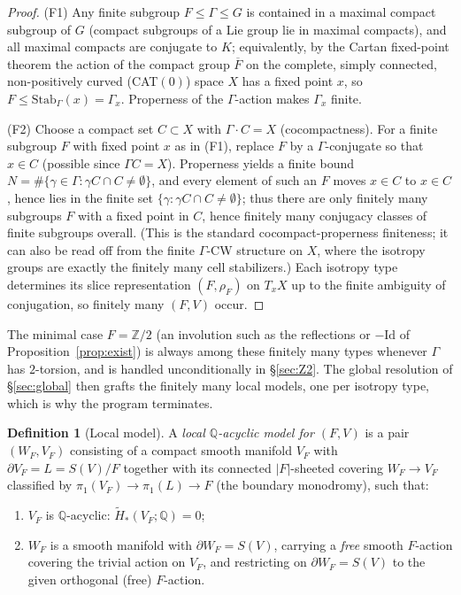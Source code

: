\documentclass[12pt]{article}
\theoremstyle{definition}
\newtheorem{definition}[theorem]{Definition}
\begin{document}
\begin{proof}
(F1) Any finite subgroup $F\le\Gamma\le G$ is contained in a maximal compact
subgroup of $G$ (compact subgroups of a Lie group lie in maximal compacts), and
all maximal compacts are conjugate to $K$; equivalently, by the Cartan
fixed-point theorem the action of the compact group $\overline F$ on the
complete, simply connected, non-positively curved (CAT$(0)$) space $X$ has a
fixed point $x$, so $F\le\mathrm{Stab}_\Gamma(x)=\Gamma_x$. Properness of the
$\Gamma$-action makes $\Gamma_x$ finite.

(F2) Choose a compact set $C\subset X$ with $\Gamma\cdot C=X$ (cocompactness).
For a finite subgroup $F$ with fixed point $x$ as in (F1), replace $F$ by a
$\Gamma$-conjugate so that $x\in C$ (possible since $\Gamma C=X$). Properness
yields a finite bound $N=\#\{\gamma\in\Gamma:\gamma C\cap C\neq\emptyset\}$, and
every element of such an $F$ moves $x\in C$ to $x\in C$, hence lies in the finite
set $\{\gamma:\gamma C\cap C\neq\emptyset\}$; thus there are only finitely many
subgroups $F$ with a fixed point in $C$, hence finitely many conjugacy classes of
finite subgroups overall. (This is the standard cocompact-properness finiteness;
it can also be read off from the finite $\Gamma$-CW structure on $X$, where the
isotropy groups are exactly the finitely many cell stabilizers.) Each isotropy
type determines its slice representation $(F,\rho_F)$ on $T_xX$ up to the finite
ambiguity of conjugation, so finitely many $(F,V)$ occur.
\end{proof}

\noindent The minimal case $F=\mathbb{Z}/2$ (an involution such as the
reflections or $-\mathrm{Id}$ of Proposition~\ref{prop:exist}) is always among
these finitely many types whenever $\Gamma$ has $2$-torsion, and is handled
unconditionally in \S\ref{sec:Z2}. The global resolution of \S\ref{sec:global}
then grafts the finitely many local models, one per isotropy type, which is why
the program terminates.


\begin{definition}[Local model]\label{def:model}
A \emph{local $\mathbb{Q}$-acyclic model for $(F,V)$} is a pair $(W_F,V_F)$
consisting of a compact smooth manifold $V_F$ with $\partial V_F=L=S(V)/F$
together with its connected $|F|$-sheeted covering $W_F\to V_F$ classified by
$\pi_1(V_F)\to\pi_1(L)\to F$ (the boundary monodromy), such that:
\begin{enumerate}
\item[(M1)] $V_F$ is $\mathbb{Q}$-acyclic: $\widetilde H_*(V_F;\mathbb{Q})=0$;
\item[(M2)] $W_F$ is a smooth manifold with $\partial W_F=S(V)$, carrying a
\emph{free} smooth $F$-action covering the trivial action on $V_F$, and
restricting on $\partial W_F=S(V)$ to the given orthogonal (free) $F$-action.
\end{enumerate}
\end{definition}
\end{document}
